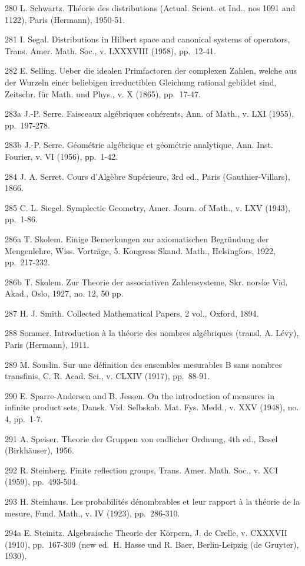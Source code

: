 280 L. Schwartz. Théorie des distributions (Actual. Scient. et Ind., nos 1091 and 1122), Paris (Hermann), 1950-51.

281 I. Segal. Distributions in Hilbert space and canonical systems of operators, Trans. Amer. Math. Soc., v. LXXXVIII (1958), pp.~12-41.

282 E. Selling. Ueber die idealen Primfactoren der complexen Zahlen, welche aus der Wurzeln einer beliebigen irreductiblen Gleichung rational gebildet sind, Zeitschr. für Math. und Phys., v. X (1865), pp.~17-47.

283a J.-P. Serre. Faisceaux algébriques cohérents, Ann. of Math., v. LXI (1955), pp.~197-278.

283b J.-P. Serre. Géométrie algébrique et géométrie analytique, Ann. Inst. Fourier, v. VI (1956), pp.~1-42.

284 J. A. Serret. Cours d'Algèbre Supérieure, 3rd ed., Paris (Gauthier-Villars), 1866.

285 C. L. Siegel. Symplectic Geometry, Amer. Journ. of Math., v. LXV (1943), pp.~1-86.

286a T. Skolem. Einige Bemerkungen zur axiomatischen Begründung der Mengenlehre, Wiss. Vorträge, 5. Kongress Skand. Math., Helsingfors, 1922, pp.~217-232.

286b T. Skolem. Zur Theorie der associativen Zahlensysteme, Skr. norske Vid. Akad., Oslo, 1927, no. 12, 50 pp.

287 H. J. Smith. Collected Mathematical Papers, 2 vol., Oxford, 1894.

288 Sommer. Introduction à la théorie des nombres algébriques (transl. A. Lévy), Paris (Hermann), 1911.

289 M. Souslin. Sur une définition des ensembles mesurables B sans nombres transfinis, C. R. Acad. Sci., v. CLXIV (1917), pp.~88-91.

290 E. Sparre-Andersen and B. Jessen. On the introduction of measures in infinite product sets, Dansk. Vid. Selbskab. Mat. Fys. Medd., v. XXV (1948), no. 4, pp.~1-7.

291 A. Speiser. Theorie der Gruppen von endlicher Ordnung, 4th ed., Basel (Birkhäuser), 1956.

292 R. Steinberg. Finite reflection groups, Trans. Amer. Math. Soc., v. XCI (1959), pp.~493-504.

293 H. Steinhaus. Les probabilités dénombrables et leur rapport à la théorie de la mesure, Fund. Math., v. IV (1923), pp.~286-310.

294a E. Steinitz. Algebraische Theorie der Körpern, J. de Crelle, v. CXXXVII (1910), pp.~167-309 (new ed.~H. Hasse und R. Baer, Berlin-Leipzig (de Gruyter), 1930).

